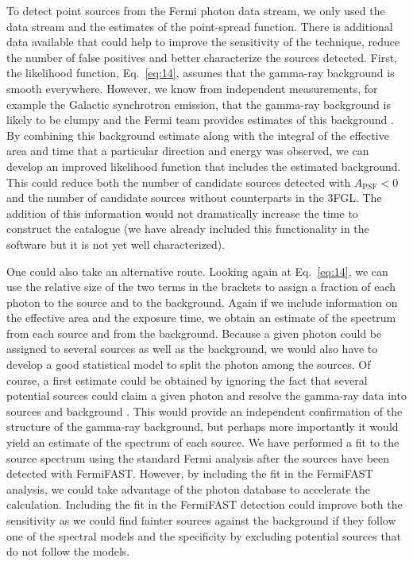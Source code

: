 \documentclass[useAMS,usenatbib]{mn2e}
\begin{document}
To detect point sources from the Fermi photon data stream, we only
used the data stream and the estimates of the point-spread
function. There is additional data available that could help to
improve the sensitivity of the technique, reduce the number of false
positives and better characterize the sources detected.  First, the
likelihood function, Eq.~\ref{eq:14}, assumes that the gamma-ray
background is smooth everywhere.  However, we know from independent
measurements, for example the Galactic synchrotron emission, that the
gamma-ray background is likely to be clumpy and the Fermi team
provides estimates of this background \citep[e.g.][]{Fermi1602.07246}.
By combining this background
estimate along with the integral of the effective area and time that a
particular direction and energy was observed, we can develop an
improved likelihood function that includes the estimated background.
This could reduce both the number of candidate sources detected with
$A_\mathrm{PSF}<0$ and the number of candidate sources without
counterparts in the 3FGL.  The addition of this information would not
dramatically increase the time to construct the catalogue (we have
already included this functionality in the software but it is not yet
well characterized).

One could also take an alternative route.  Looking again at
Eq.~\ref{eq:14}, we can use the relative size of the two terms in the
brackets to assign a fraction of each photon to the source and to the
background.  Again if we include information on the effective area and
the exposure time, we obtain an estimate of the spectrum from each
source and from the background.  Because a given photon could be
assigned to several sources as well as the background, we would also
have to develop a good statistical model to split the photon among the
sources.  Of course, a first estimate could be obtained by ignoring
the fact that several potential sources could claim a given photon and
resolve the gamma-ray data into sources and background \citep[as done
 by][]{2015A&A...581A.126S}. This would provide an independent
confirmation of the structure of the gamma-ray background, but perhaps
more importantly it would yield an estimate of the spectrum of each
source. We have performed a fit to the source spectrum using the
standard Fermi analysis after the sources have been detected with
FermiFAST.  However, by including the fit in the FermiFAST analysis,
we could take advantage of the photon database to accelerate the
calculation.  Including the fit in the FermiFAST detection could
improve both the sensitivity as we could find fainter sources against
the background if they follow one of the spectral models and the
specificity by excluding potential sources that do not follow the
models.
\end{document}
